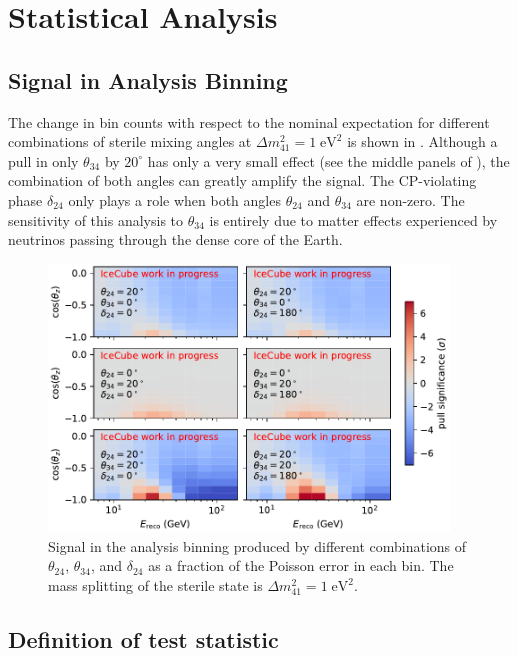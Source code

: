 \section{Statistical Analysis}

\subsection{Signal in Analysis Binning}
The change in bin counts with respect to the nominal expectation for different combinations of sterile mixing angles at $\Delta m^2_{41}=1\;\mathrm{eV^2}$ is shown in . Although a pull in only $\theta_{34}$ by $20^\circ$ has only a very small effect (see the middle panels of ), the combination of both angles can greatly amplify the signal. The CP-violating phase $\delta_{24}$ only plays a role when both angles $\theta_{24}$ and $\theta_{34}$ are non-zero. The sensitivity of this analysis to $\theta_{34}$ is entirely due to matter effects experienced by neutrinos passing through the dense core of the Earth.

\begin{figure}
    \centering
    \includegraphics[width=0.95\textwidth]{figures/measurement/sterile_analysis/oscillation_signal/pull_theta_combinations_20deg_dcp24.pdf}
    \caption{Signal in the analysis binning produced by different combinations of $\theta_{24}$, $\theta_{34}$, and $\delta_{24}$ as a fraction of the Poisson error in each bin. The mass splitting of the sterile state is $\Delta m^2_{41}=1\;\mathrm{eV^2}$.}
    \label{fig:oscillation-effects-ana-binning}
\end{figure}

\subsection{Definition of test statistic}
\label{sec:test-statistic-sterile}

